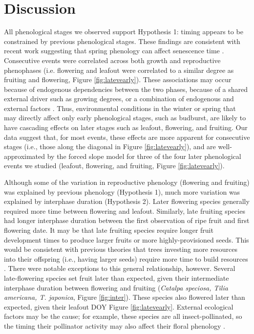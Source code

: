 \documentclass{article}
\begin{document}
\section* {Discussion}
\par All phenological stages we observed support Hypothesis 1: timing appears to be constrained by previous phenological stages. These findings are consistent with recent work suggesting that spring phenology can affect senescence time \citep{keenan2015,liu2016}. Consecutive events were correlated across both growth and reproductive phenophases (i.e. flowering and leafout were correlated to a similar degree as fruiting and flowering, Figure \ref{fig:latevearly}). These associations may occur because of endogenous dependencies between the two phases, because of a shared external driver such as growing degrees, or a combination of endogenous and external factors \citep{lechowicz1995}. Thus, environmental conditions in the winter or spring that may directly affect only early phenological stages, such as budburst, are likely to have cascading effects on later stages such as leafout, flowering, and fruiting. Our data suggest that, for most events, these effects are more apparent for consecutive stages (i.e., those along the diagonal in Figure \ref{fig:latevearly}), and are well-approximated by the forced slope model for three of the four later phenological events we studied (leafout, flowering, and fruiting, Figure \ref{fig:latevearly}). 

\par Although some of the variation in reproductive phenology (flowering and fruiting) was explained by previous phenology (Hypothesis 1), much more variation was explained by interphase duration (Hypothesis 2). Later flowering species generally required more time between flowering and leafout. Similarly, late fruiting species had longer interphase duration between the first observation of ripe fruit and first flowering date. It may be that late fruiting species require longer fruit development times to produce larger fruits or more highly-provisioned seeds. This would be consistent with previous theories that trees investing more resources into their offspring (i.e., having larger seeds) require more time to build resources \citep{bolmgren2008,sun2011}. There were notable exceptions to this general relationship, however. Several late-flowering species  set fruit later than expected, given their intermediate interphase duration between flowering and fruiting (\textit{Catalpa speciosa, Tilia americana, T. japonica}, Figure \ref{fig:inter}). These species also flowered later than expected, given their leafout DOY Figure \ref{fig:latevearly}. External ecological factors may be the cause; for example, these species are all insect-pollinated, so the timing their pollinator activity may also affect their floral phenology \citep{elzinga2007}.  
\end{document}
